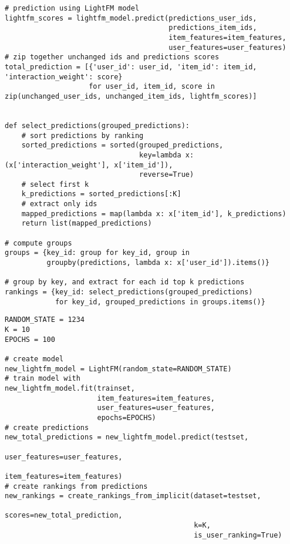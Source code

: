 \begin{lstlisting}[caption=esempio di utilizzo completo della libreria \textit{LightFM}]
# prediction using LightFM model
lightfm_scores = lightfm_model.predict(predictions_user_ids,
                                       predictions_item_ids,
                                       item_features=item_features,
                                       user_features=user_features)
# zip together unchanged ids and predictions scores
total_prediction = [{'user_id': user_id, 'item_id': item_id, 'interaction_weight': score}
                    for user_id, item_id, score in zip(unchanged_user_ids, unchanged_item_ids, lightfm_scores)]


def select_predictions(grouped_predictions):
    # sort predictions by ranking
    sorted_predictions = sorted(grouped_predictions, 
                                key=lambda x: (x['interaction_weight'], x['item_id']), 
                                reverse=True)
    # select first k
    k_predictions = sorted_predictions[:K]
    # extract only ids
    mapped_predictions = map(lambda x: x['item_id'], k_predictions)
    return list(mapped_predictions)

# compute groups
groups = {key_id: group for key_id, group in 
          groupby(predictions, lambda x: x['user_id']).items()}

# group by key, and extract for each id top k predictions
rankings = {key_id: select_predictions(grouped_predictions)
            for key_id, grouped_predictions in groups.items()}
\end{lstlisting}

\begin{lstlisting}[caption=esempio di utilizzo del modello \texttt{LightFM} libreria]
RANDOM_STATE = 1234
K = 10
EPOCHS = 100

# create model
new_lightfm_model = LightFM(random_state=RANDOM_STATE)
# train model with
new_lightfm_model.fit(trainset, 
                      item_features=item_features,
                      user_features=user_features, 
                      epochs=EPOCHS)
# create predictions
new_total_predictions = new_lightfm_model.predict(testset, 
                                                  user_features=user_features,
                                                  item_features=item_features)
# create rankings from predictions
new_rankings = create_rankings_from_implicit(dataset=testset,
                                             scores=new_total_prediction, 
                                             k=K, 
                                             is_user_ranking=True)
\end{lstlisting}

